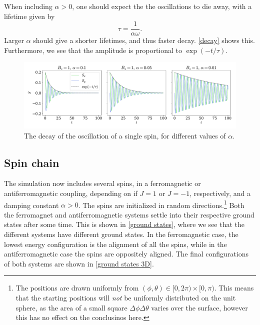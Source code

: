 \documentclass{article}
\begin{document}
    When including $\alpha > 0$, one should expect the the oscillations to die away, with a lifetime given by
    \begin{equation*}
        \tau = \frac{1}{\alpha \omega}.
    \end{equation*}
    Larger $\alpha$ should give a shorter lifetimes, and thus faster decay.
    \autoref{decay} shows this.
    Furthermore, we see that the amplitude is proportional to $\exp(-t/\tau)$.
    
    \begin{figure}[H]
        \centering
        \includegraphics[width=\textwidth]{../plots/decay_a.pdf}
        \caption{The decay of the oscillation of a single spin, for different values of $\alpha$.}
        \label{decay}
    \end{figure}

    \subsection*{Spin chain}
    The simulation now includes several spins, in a ferromagnetic or antiferromagnetic coupling, depending on if $J = 1$ or $J = -1$, respectively, and a damping constant $\alpha > 0$.
    The spins are initialized in random directions.\footnote{The positions are drawn uniformly from $(\phi, \theta)\in[0, 2\pi)\times[0, \pi)$. 
    This means that the starting positions will \emph{not} be uniformly distributed on the unit sphere, as the area of a small square $\Delta \phi \Delta \theta$ varies over the surface, however this has no effect on the conclusinos here.}
    Both the ferromagnet and antiferromagnetic systems settle into their respective ground states after some time.
    This is shown in \autoref{ground states}, where we see that the different systems have different ground states.
    In the ferromagnetic case, the lowest energy configuration is the alignment of all the spins, while in the antiferromagnetic case the spins are oppositely aligned.
    The final configurations of both systems are shown in \autoref{ground states 3D}.
\end{document}
